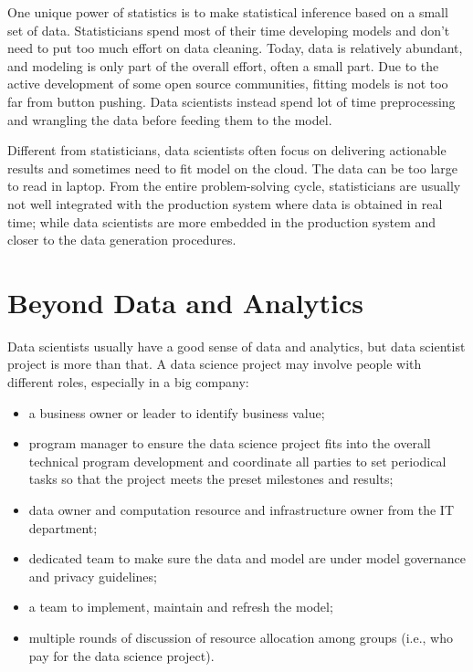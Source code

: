 \documentclass[12pt,]{krantz}
\providecommand{\tightlist}{%
  \setlength{\itemsep}{0pt}\setlength{\parskip}{0pt}}
\theoremstyle{definition}
\theoremstyle{definition}
\theoremstyle{definition}
\theoremstyle{remark}
\begin{document}
One unique power of statistics is to make statistical inference based on
a small set of data. Statisticians spend most of their time developing
models and don't need to put too much effort on data cleaning. Today,
data is relatively abundant, and modeling is only part of the overall
effort, often a small part. Due to the active development of some open
source communities, fitting models is not too far from button pushing.
Data scientists instead spend lot of time preprocessing and wrangling
the data before feeding them to the model.

Different from statisticians, data scientists often focus on delivering
actionable results and sometimes need to fit model on the cloud. The
data can be too large to read in laptop. From the entire problem-solving
cycle, statisticians are usually not well integrated with the production
system where data is obtained in real time; while data scientists are
more embedded in the production system and closer to the data generation
procedures.

\section{Beyond Data and Analytics}\label{beyond-data-and-analytics}

Data scientists usually have a good sense of data and analytics, but
data scientist project is more than that. A data science project may
involve people with different roles, especially in a big company:

\begin{itemize}
\tightlist
\item
  a business owner or leader to identify business value;
\item
  program manager to ensure the data science project fits into the
  overall technical program development and coordinate all parties to
  set periodical tasks so that the project meets the preset milestones
  and results;
\item
  data owner and computation resource and infrastructure owner from the
  IT department;
\item
  dedicated team to make sure the data and model are under model
  governance and privacy guidelines;
\item
  a team to implement, maintain and refresh the model;
\item
  multiple rounds of discussion of resource allocation among groups
  (i.e., who pay for the data science project).
\end{itemize}
\end{document}
